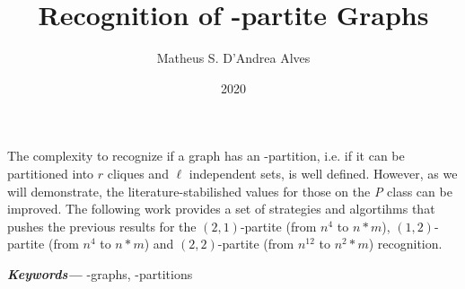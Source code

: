 
\providecommand{\keywords}[1]
{
  \small
  \textbf{\textit{Keywords---}} #1
}

\title{Recognition of \RL-partite Graphs}
\author{Matheus S. D'Andrea Alves}
\date{2020}
\imprimircapa

\begin{resumo}
  The complexity to recognize if a graph has an \RL-partition, i.e. if it can be partitioned into $r$ cliques and $\ell$ independent sets, is well defined\cite{brand-84}. However, as we will demonstrate, the literature-stabilished values for those on the \textit{P} class can be improved. The following work provides a set of strategies and algortihms that pushes the previous results for the $(2,1)$-partite (from $n^4$ to $n*m$), $(1,2)$-partite (from $n^4$ to $n*m$) and $(2,2)$-partite (from $n^{12}$ to $n^{2}*m$) recognition.

  \keywords{\RL-graphs, \RL-partitions}
\end{resumo}

\listoffigures*
\listoftables*
\tableofcontents
